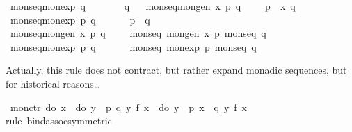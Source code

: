 \begin{isabellebody}
\ {\isachardoublequote}{\isacharunderscore}monseq{\isacharparenleft}{\isacharunderscore}monexp{}\ q{\isacharparenright}{\isachardoublequote}\ \ \ \ \ \ \ {\isasymrightharpoonup}\ {\isachardoublequote}q{\isachardoublequote}\isanewline
\ %
\isanewline
\ {\isachardoublequote}{\isacharunderscore}monseq{\isacharparenleft}{\isacharunderscore}mongen\ x\ p\ q{\isacharparenright}{\isachardoublequote}\ \ \ \ {\isasymleftharpoondown}\ {\isachardoublequote}p\ {\isasymggreater}{\isacharequal}\ {\isacharparenleft}{\isacharpercent}x{\isachardot}\ q{\isacharparenright}{\isachardoublequote}\isanewline
\ {\isachardoublequote}{\isacharunderscore}monseq{\isacharparenleft}{\isacharunderscore}monexp\ p\ q{\isacharparenright}{\isachardoublequote}\ \ \ \ \ \ {\isasymleftharpoondown}\ {\isachardoublequote}p\ {\isasymggreater}\ q{\isachardoublequote}\isanewline
\ %
\isanewline
\ {\isachardoublequote}{\isacharunderscore}monseq{\isacharparenleft}{\isacharunderscore}mongen\ x\ p\ q{\isacharparenright}{\isachardoublequote}\ \ \ \ {\isasymleftharpoondown}\ {\isachardoublequote}{\isacharunderscore}monseq\ {\isacharparenleft}{\isacharunderscore}mongen\ x\ p\ {\isacharparenleft}{\isacharunderscore}monseq\ q{\isacharparenright}{\isacharparenright}{\isachardoublequote}\isanewline
\ {\isachardoublequote}{\isacharunderscore}monseq{\isacharparenleft}{\isacharunderscore}monexp\ p\ q{\isacharparenright}{\isachardoublequote}\ \ \ \ \ \ {\isasymleftharpoondown}\ {\isachardoublequote}{\isacharunderscore}monseq\ {\isacharparenleft}{\isacharunderscore}monexp\ p\ {\isacharparenleft}{\isacharunderscore}monseq\ q{\isacharparenright}{\isacharparenright}{\isachardoublequote}\isamarkupfalse%
%
\begin{isamarkuptext}%
Actually, this rule does not contract, but rather expand monadic 
  sequences, but for historical reasons\dots%
\end{isamarkuptext}%
\isamarkuptrue%
\ mon{\isacharunderscore}ctr{\isacharcolon}\ {\isachardoublequote}{\isacharparenleft}do\ {\isacharbraceleft}x\ {\isasymleftarrow}\ {\isacharparenleft}do\ {\isacharbraceleft}y\ {\isasymleftarrow}\ p{\isacharsemicolon}\ q\ y{\isacharbraceright}{\isacharparenright}{\isacharsemicolon}\ f\ x{\isacharbraceright}{\isacharparenright}\ {\isacharequal}\ {\isacharparenleft}do\ {\isacharbraceleft}y\ {\isasymleftarrow}\ p{\isacharsemicolon}\ x\ {\isasymleftarrow}\ q\ y{\isacharsemicolon}\ f\ x{\isacharbraceright}{\isacharparenright}{\isachardoublequote}\isanewline
\ \ \isamarkupfalse%
rule\ bind{\isacharunderscore}assoc{\isacharbrackleft}symmetric{\isacharbrackright}{\isacharparenright}\isanewline
\isanewline
\ \ \isanewline
\isanewline
\isamarkupfalse%
\isanewline
\isamarkupfalse%
\end{isabellebody}%
